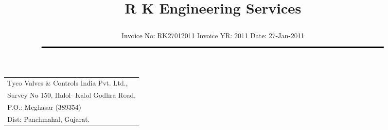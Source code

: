 \documentclass[11pt]{article}
\title{\vspace*{-1.5cm} \centerline{ \Huge \bf \hspace{0cm} R K Engineering Services}\vspace*{-0.75cm}}
\author{%
 \scriptsize Invoice No: RK27012011  \hspace*{4cm}  Invoice YR: 2011 \hspace*{4cm} Date: 27-Jan-2011\\
$\rule{7.0in}{0.5mm}$}
\date{}
\begin{document}
\maketitle
\thispagestyle{empty}
\vspace*{1cm}	
\begin{flushleft}
{\footnotesize
\begin{tabular}{l}
Tyco Valves \& Controls India Pvt. Ltd.,\\
Survey No 150, Halol- Kalol Godhra Road,\\
P.O.:  Meghasar (389354)\\
Dist: Panchmahal, Gujarat.\\
\end{tabular}
}
\end{flushleft}

\vspace*{1cm}

\vspace*{-1cm}

\end{document}
